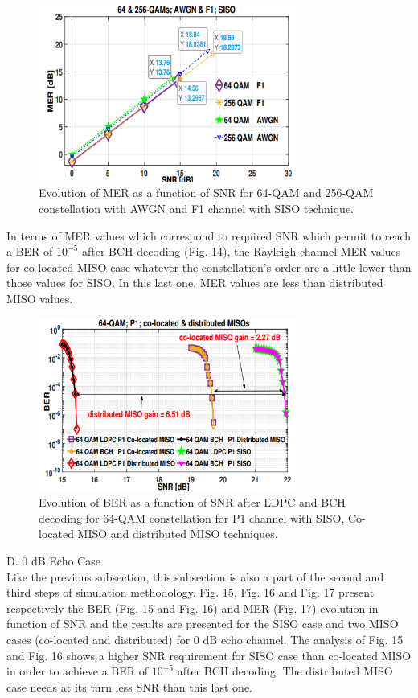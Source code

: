 \documentclass[10pt, conference]{IEEEtran}
\begin{document}
 

\begin{figure}[!htbp]
\centering
    \includegraphics[width=8.5cm]{images/img1.png}
    \caption{ Evolution of MER as a function of SNR for 64-QAM and 256-QAM constellation with AWGN and F1 channel with SISO technique.}
\end{figure}
\linespread{1.1}
\normalsize{
In terms of MER values which correspond to required SNR which permit to reach a BER of $10^{-5}$ after BCH decoding (Fig. 14), the Rayleigh channel MER values for co-located MISO case whatever the constellation’s order are a little lower than those values for SISO. In this last one, MER values are less than distributed MISO values.


\begin{figure}[!htbp]
\centering
    \includegraphics[width=8.5cm]{images/img2.png}
    \caption{Evolution of BER as a function of SNR after LDPC and BCH decoding for 64-QAM constellation for P1 channel with SISO, Co-located MISO and distributed MISO techniques.}
\end{figure}


 D. 0 dB Echo Case\\
Like the previous subsection, this subsection is also a part of the second and third steps of simulation methodology. Fig. 15, Fig. 16 and Fig. 17 present respectively the BER (Fig. 15 and Fig. 16) and MER (Fig. 17) evolution in function of SNR and the results are presented for the SISO case and two MISO cases (co-located and distributed) for 0 dB echo channel. The analysis of Fig. 15 and Fig. 16 shows a higher SNR requirement for SISO case than co-located MISO in order to achieve a BER of $10^{-5}$ after BCH decoding. The distributed MISO case needs at its turn less SNR than this last one.
}
\end{document}
